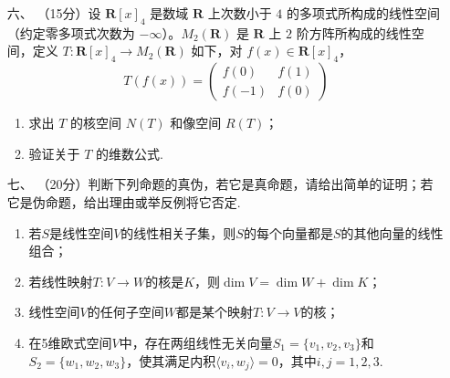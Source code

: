 \begin{enumerate}
	\item[六、]（15分）设 $\mathbf{R}[x]_4$ 是数域 $\mathbf{R}$ 上次数小于 $4$ 的多项式所构成的线性空间（约定零多项式次数为 $-\infty$）。$M_2(\mathbf{R})$ 是 $\mathbf{R}$ 上 $2$ 阶方阵所构成的线性空间，定义 $T : \mathbf{R}[x]_4 \to M_2(\mathbf{R})$ 如下，对 $f(x) \in \mathbf{R}[x]_4$，
    \[T(f(x))=\begin{pmatrix}f(0) & f(1) \\ f(-1) & f(0)\end{pmatrix}\]
    \begin{enumerate}
        \item 求出 $T$ 的核空间 $N(T)$ 和像空间 $R(T)$；
        \item 验证关于 $T$ 的维数公式.
    \end{enumerate}
	\item[七、]（20分）判断下列命题的真伪，若它是真命题，请给出简单的证明；若它是伪命题，给出理由或举反例将它否定.
	\begin{enumerate}[label=(\arabic*)]
        \item 若$S$是线性空间$V$的线性相关子集，则$S$的每个向量都是$S$的其他向量的线性组合；
        \item 若线性映射$T:V\to W$的核是$K$，则$\dim V=\dim W+\dim K$；
        \item 线性空间$V$的任何子空间$W$都是某个映射$T:V\to V$的核；
        \item 在5维欧式空间$V$中，存在两组线性无关向量$S_1=\{v_1,v_2,v_3\}$和$S_2=\{w_1,w_2,w_3\}$，使其满足内积$\langle v_i,w_j\rangle=0$，其中$i,j=1,2,3$.
    \end{enumerate}
\end{enumerate}

\clearpage
